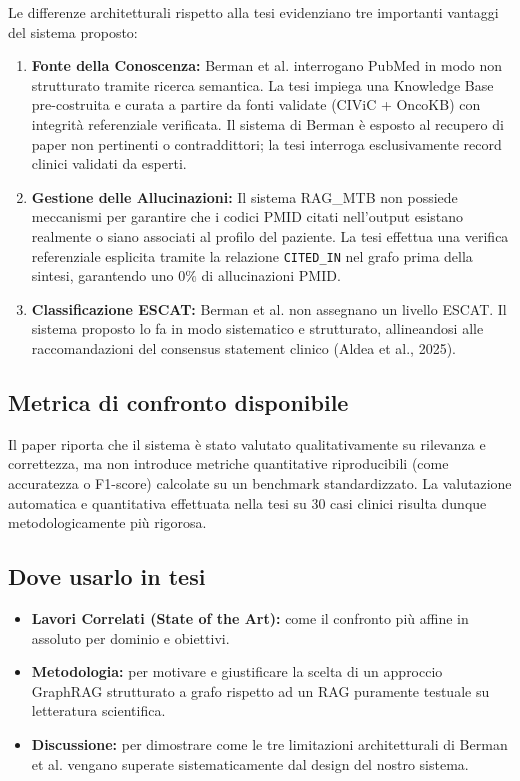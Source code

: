 \documentclass[12pt, a4paper]{article}
\begin{document}
Le differenze architetturali rispetto alla tesi evidenziano tre importanti vantaggi del sistema proposto:
\begin{enumerate}[leftmargin=2em, label=\textbf{\arabic*.}]
  \item \textbf{Fonte della Conoscenza:} Berman et al. interrogano PubMed in modo non strutturato tramite ricerca semantica. La tesi impiega una Knowledge Base pre-costruita e curata a partire da fonti validate (CIViC + OncoKB) con integrità referenziale verificata. Il sistema di Berman è esposto al recupero di paper non pertinenti o contraddittori; la tesi interroga esclusivamente record clinici validati da esperti.
  \item \textbf{Gestione delle Allucinazioni:} Il sistema RAG\_MTB non possiede meccanismi per garantire che i codici PMID citati nell'output esistano realmente o siano associati al profilo del paziente. La tesi effettua una verifica referenziale esplicita tramite la relazione \texttt{CITED\_IN} nel grafo prima della sintesi, garantendo uno $0\%$ di allucinazioni PMID.
  \item \textbf{Classificazione ESCAT:} Berman et al. non assegnano un livello ESCAT. Il sistema proposto lo fa in modo sistematico e strutturato, allineandosi alle raccomandazioni del consensus statement clinico (Aldea et al., 2025).
\end{enumerate}

\subsection{Metrica di confronto disponibile}
Il paper riporta che il sistema è stato valutato qualitativamente su rilevanza e correttezza, ma non introduce metriche quantitative riproducibili (come accuratezza o F1-score) calcolate su un benchmark standardizzato. La valutazione automatica e quantitativa effettuata nella tesi su 30 casi clinici risulta dunque metodologicamente più rigorosa.

\subsection{Dove usarlo in tesi}
\begin{itemize}[leftmargin=1.8em, itemsep=2pt]
  \item \textbf{Lavori Correlati (State of the Art):} come il confronto più affine in assoluto per dominio e obiettivi.
  \item \textbf{Metodologia:} per motivare e giustificare la scelta di un approccio GraphRAG strutturato a grafo rispetto ad un RAG puramente testuale su letteratura scientifica.
  \item \textbf{Discussione:} per dimostrare come le tre limitazioni architetturali di Berman et al. vengano superate sistematicamente dal design del nostro sistema.
\end{itemize}
\end{document}

